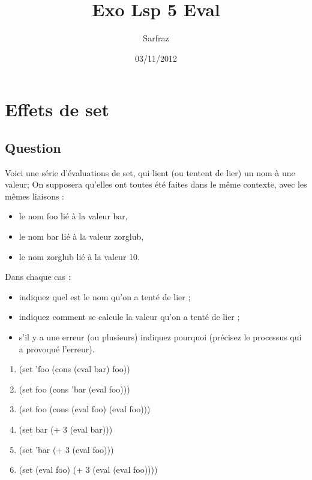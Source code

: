 \documentclass[a4paper, 11pt]{article}
\title{Exo Lsp 5 Eval }
\author{Sarfraz \bsc{kapasi}}
\date{03/11/2012}
\begin{document}
%
\maketitle
%
\section{Effets de set}
\subsection{Question}
Voici une série d'évaluations de set, qui lient (ou tentent de lier) un nom à une valeur;
On supposera qu'elles ont toutes été faites dans le même contexte, avec les mêmes liaisons :
\begin{itemize}
    \item le nom foo lié à la valeur bar,
    \item le nom bar lié à la valeur zorglub,
    \item le nom zorglub lié à la valeur 10.
\end{itemize}
Dans chaque cas :
\begin{itemize}
    \item indiquez quel est le nom qu'on a tenté de lier ;
    \item indiquez comment se calcule la valeur qu'on a tenté de lier ;
    \item s'il y a une erreur (ou plusieurs) indiquez pourquoi (précisez le processus qui a provoqué l'erreur).\\
\end{itemize}
\begin{enumerate}
    \item (set 'foo (cons (eval bar) foo))
    \item (set foo (cons 'bar (eval foo)))
    \item (set foo (cons (eval foo) (eval foo)))
    \item (set bar (+ 3 (eval bar)))
    \item (set 'bar (+ 3 (eval foo)))
    \item (set (eval foo) (+ 3 (eval (eval foo))))
\end{enumerate}
\end{document}
